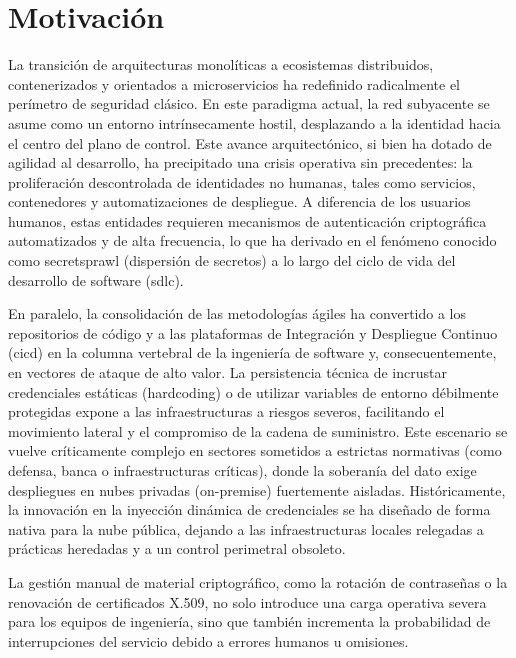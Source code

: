\documentclass[runningheads]{llncs}
\begin{document}
\section{Motivación}

La transición de arquitecturas monolíticas a ecosistemas distribuidos, contenerizados y orientados a microservicios ha redefinido radicalmente el perímetro de seguridad clásico. En este paradigma actual, la red subyacente se asume como un entorno intrínsecamente hostil, desplazando a la identidad hacia el centro del plano de control. Este avance arquitectónico, si bien ha dotado de agilidad al desarrollo, ha precipitado una crisis operativa sin precedentes: la proliferación descontrolada de identidades no humanas, tales como servicios, contenedores y automatizaciones de despliegue. A diferencia de los usuarios humanos, estas entidades requieren mecanismos de autenticación criptográfica automatizados y de alta frecuencia, lo que ha derivado en el fenómeno conocido como \gls{secretsprawl} (dispersión de secretos) a lo largo del ciclo de vida del desarrollo de software (\gls{sdlc}).

En paralelo, la consolidación de las metodologías ágiles ha convertido a los repositorios de código y a las plataformas de Integración y Despliegue Continuo (\gls{cicd}) en la columna vertebral de la ingeniería de software y, consecuentemente, en vectores de ataque de alto valor. La persistencia técnica de incrustar credenciales estáticas (hardcoding) o de utilizar variables de entorno débilmente protegidas expone a las infraestructuras a riesgos severos, facilitando el movimiento lateral y el compromiso de la cadena de suministro. Este escenario se vuelve críticamente complejo en sectores sometidos a estrictas normativas (como defensa, banca o infraestructuras críticas), donde la soberanía del dato exige despliegues en nubes privadas (on-premise) fuertemente aisladas. Históricamente, la innovación en la inyección dinámica de credenciales se ha diseñado de forma nativa para la nube pública, dejando a las infraestructuras locales relegadas a prácticas heredadas y a un control perimetral obsoleto.

La gestión manual de material criptográfico, como la rotación de contraseñas o la renovación de certificados X.509, no solo introduce una carga operativa severa para los equipos de ingeniería, sino que también incrementa la probabilidad de interrupciones del servicio debido a errores humanos u omisiones.
\end{document}
